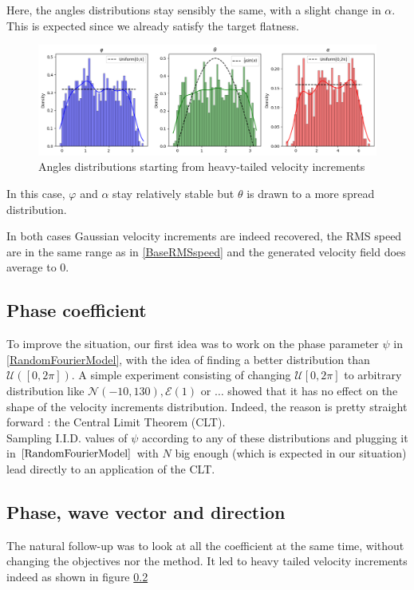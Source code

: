 \documentclass[a4paper,12pt]{article}
\theoremstyle{definition}
\begin{document}
Here, the angles distributions stay sensibly the same, with a slight change in $\alpha$. This is expected since we already satisfy the target flatness.

\begin{figure}[H]
    \centering
    \includegraphics[width=1.0\linewidth]{illustrations/StartHeavyTail.png}
    \caption{Angles distributions starting from heavy-tailed velocity increments}
\end{figure}

In this case, $\varphi$ and $\alpha$ stay relatively stable but $\theta$ is drawn to a more spread distribution. 

\bigskip
In both cases Gaussian velocity increments are indeed recovered, the RMS speed are in the same range as in \ref{BaseRMSspeed} and the generated velocity field does average to 0.

\subsection{Phase coefficient}
To improve the situation, our first idea was to work on the phase parameter $\psi$ in \ref{RandomFourierModel}, with the idea of finding a better distribution than $\mathcal{U}([0,2\pi])$. A simple experiment consisting of changing $\mathcal{U}[0,2\pi]$ to arbitrary distribution like $\mathcal{N}(-10,130), \mathcal{E}(1)$ or $\mathcal{\ldots}$ showed that it has no effect on the shape of the velocity increments distribution. Indeed, the reason is pretty straight forward : the Central Limit Theorem (CLT). \\
Sampling I.I.D. values of $\psi$ according to any of these distributions and plugging it in $\ref{RandomFourierModel}$ with $N$ big enough (which is expected in our situation) lead directly to an application of the CLT. 

\bigskip


\subsection{Phase, wave vector and direction}
The natural follow-up was to look at all the coefficient at the same time, without changing the objectives nor the method. It led to heavy tailed velocity increments indeed as shown in figure \ref{}
\end{document}
